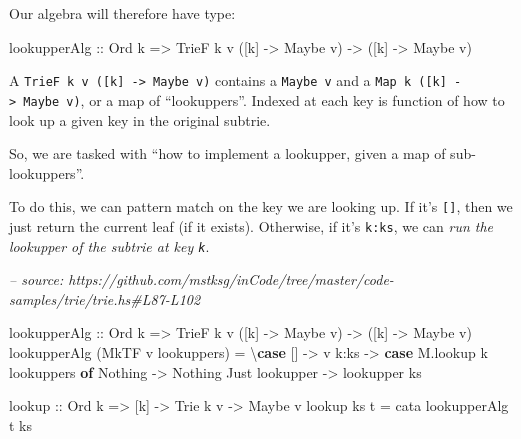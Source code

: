\documentclass[]{article}
\newenvironment{Shaded}{}{}
\newcommand{\CommentTok}[1]{\textcolor[rgb]{0.38,0.63,0.69}{\textit{#1}}}
\newcommand{\DataTypeTok}[1]{\textcolor[rgb]{0.56,0.13,0.00}{#1}}
\newcommand{\FunctionTok}[1]{\textcolor[rgb]{0.02,0.16,0.49}{#1}}
\newcommand{\KeywordTok}[1]{\textcolor[rgb]{0.00,0.44,0.13}{\textbf{#1}}}
\newcommand{\NormalTok}[1]{#1}
\newcommand{\OtherTok}[1]{\textcolor[rgb]{0.00,0.44,0.13}{#1}}
\begin{document}
Our algebra will therefore have type:

\begin{Shaded}
\begin{Highlighting}[]
\NormalTok{lookupperAlg}
\OtherTok{    ::} \DataTypeTok{Ord}\NormalTok{ k}
    \OtherTok{=>} \DataTypeTok{TrieF}\NormalTok{ k v ([k] }\OtherTok{->} \DataTypeTok{Maybe}\NormalTok{ v)}
    \OtherTok{->}\NormalTok{ ([k] }\OtherTok{->} \DataTypeTok{Maybe}\NormalTok{ v)}
\end{Highlighting}
\end{Shaded}

A \texttt{TrieF\ k\ v\ ({[}k{]}\ -\textgreater{}\ Maybe\ v)} contains a
\texttt{Maybe\ v} and a \texttt{Map\ k\ ({[}k{]}\ -\textgreater{}\ Maybe\ v)},
or a map of ``lookuppers''. Indexed at each key is function of how to look up a
given key in the original subtrie.

So, we are tasked with ``how to implement a lookupper, given a map of
sub-lookuppers''.

To do this, we can pattern match on the key we are looking up. If it's
\texttt{{[}{]}}, then we just return the current leaf (if it exists). Otherwise,
if it's \texttt{k:ks}, we can \emph{run the lookupper of the subtrie at key
\texttt{k}}.

\begin{Shaded}
\begin{Highlighting}[]
\CommentTok{-- source: https://github.com/mstksg/inCode/tree/master/code-samples/trie/trie.hs#L87-L102}

\NormalTok{lookupperAlg}
\OtherTok{    ::} \DataTypeTok{Ord}\NormalTok{ k}
    \OtherTok{=>} \DataTypeTok{TrieF}\NormalTok{ k v ([k] }\OtherTok{->} \DataTypeTok{Maybe}\NormalTok{ v)}
    \OtherTok{->}\NormalTok{ ([k] }\OtherTok{->} \DataTypeTok{Maybe}\NormalTok{ v)}
\NormalTok{lookupperAlg (}\DataTypeTok{MkTF}\NormalTok{ v lookuppers) }\FunctionTok{=}\NormalTok{ \textbackslash{}}\KeywordTok{case}
\NormalTok{    []   }\OtherTok{->}\NormalTok{ v}
\NormalTok{    k}\FunctionTok{:}\NormalTok{ks }\OtherTok{->} \KeywordTok{case}\NormalTok{ M.lookup k lookuppers }\KeywordTok{of}
      \DataTypeTok{Nothing}        \OtherTok{->} \DataTypeTok{Nothing}
      \DataTypeTok{Just}\NormalTok{ lookupper }\OtherTok{->}\NormalTok{ lookupper ks}

\FunctionTok{lookup}
\OtherTok{    ::} \DataTypeTok{Ord}\NormalTok{ k}
    \OtherTok{=>}\NormalTok{ [k]}
    \OtherTok{->} \DataTypeTok{Trie}\NormalTok{ k v}
    \OtherTok{->} \DataTypeTok{Maybe}\NormalTok{ v}
\FunctionTok{lookup}\NormalTok{ ks t }\FunctionTok{=}\NormalTok{ cata lookupperAlg t ks}
\end{Highlighting}
\end{Shaded}
\end{document}

